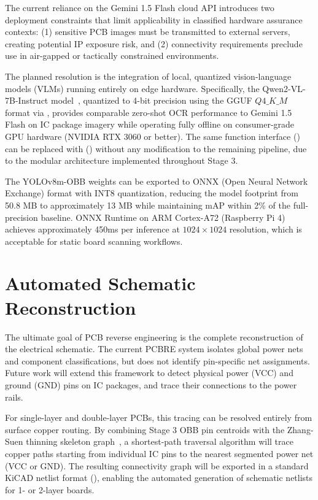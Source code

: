 \documentclass[12pt,a4paper]{report}
\begin{document}
The current reliance on the Gemini 1.5 Flash cloud API introduces two deployment constraints that limit applicability in classified hardware assurance contexts: (1) sensitive PCB images must be transmitted to external servers, creating potential IP exposure risk, and (2) connectivity requirements preclude use in air-gapped or tactically constrained environments.

The planned resolution is the integration of local, quantized vision-language models (VLMs) running entirely on edge hardware. Specifically, the Qwen2-VL-7B-Instruct model~\cite{wang2024qwen2vl}, quantized to 4-bit precision using the GGUF $Q4\_K\_M$ format via , provides comparable zero-shot OCR performance to Gemini 1.5 Flash on IC package imagery while operating fully offline on consumer-grade GPU hardware (NVIDIA RTX 3060 or better). The same function interface () can be replaced with () without any modification to the remaining pipeline, due to the modular architecture implemented throughout Stage 3.

The YOLOv8m-OBB weights can be exported to ONNX (Open Neural Network Exchange) format with INT8 quantization, reducing the model footprint from 50.8 MB to approximately 13 MB while maintaining mAP within 2\% of the full-precision baseline. ONNX Runtime on ARM Cortex-A72 (Raspberry Pi 4) achieves approximately 450ms per inference at $1024 \times 1024$ resolution, which is acceptable for static board scanning workflows.

\section{Automated Schematic Reconstruction}
\label{sec:future_schematic}

The ultimate goal of PCB reverse engineering is the complete reconstruction of the electrical schematic. The current PCBRE system isolates global power nets and component classifications, but does not identify pin-specific net assignments. Future work will extend this framework to detect physical power (VCC) and ground (GND) pins on IC packages, and trace their connections to the power rails.

For single-layer and double-layer PCBs, this tracing can be resolved entirely from surface copper routing. By combining Stage 3 OBB pin centroids with the Zhang-Suen thinning skeleton graph~\cite{zhang1984thinning}, a shortest-path traversal algorithm will trace copper paths starting from individual IC pins to the nearest segmented power net (VCC or GND). The resulting connectivity graph will be exported in a standard KiCAD netlist format (), enabling the automated generation of schematic netlists for 1- or 2-layer boards.
\end{document}
